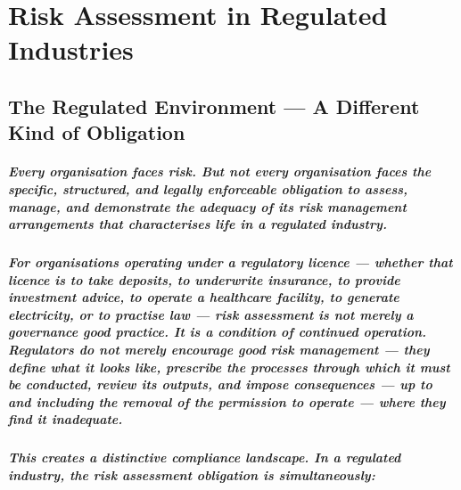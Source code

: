 \chapter{Risk Assessment in Regulated Industries}
\label{chap:Risk Assessment in Regulated Industries}

\section{The Regulated Environment — A Different Kind of Obligation}
\paragraph{Every organisation faces risk. But not every organisation faces the specific, structured, and legally enforceable obligation to assess, manage, and demonstrate the adequacy of its risk management arrangements that characterises life in a regulated industry.}
\paragraph{For organisations operating under a regulatory licence — whether that licence is to take deposits, to underwrite insurance, to provide investment advice, to operate a healthcare facility, to generate electricity, or to practise law — risk assessment is not merely a governance good practice. It is a condition of continued operation. Regulators do not merely encourage good risk management — they define what it looks like, prescribe the processes through which it must be conducted, review its outputs, and impose consequences — up to and including the removal of the permission to operate — where they find it inadequate.}
\paragraph{This creates a distinctive compliance landscape. In a regulated industry, the risk assessment obligation is simultaneously:}
\begin{itemize}
\end{itemize}

